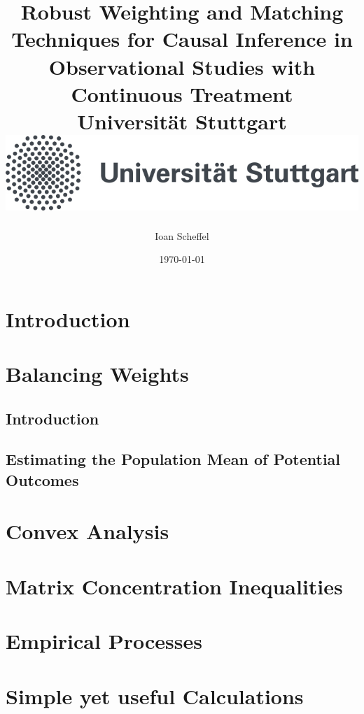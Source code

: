 \documentclass[12pt]{scrreport}
\title{
  {
    Robust Weighting and Matching Techniques for Causal Inference in Observational Studies with Continuous Treatment
  }
  \\
  {\large Universität Stuttgart}
  \\
  {\includegraphics{unistuttgart_logo_deutsch.jpg}}
}
\author{Ioan Scheffel}
\date{\today}
\begin{document}
\maketitle

\tableofcontents 

\chapter{Introduction}


\chapter{Balancing Weights}
  \section{Introduction}
  
  \section{Estimating the Population Mean of Potential Outcomes}
  

\chapter{Convex Analysis}


\chapter{Matrix Concentration Inequalities}


\chapter{Empirical Processes}


\chapter{Simple yet useful Calculations} 



\printnomenclature

{}

\end{document}
